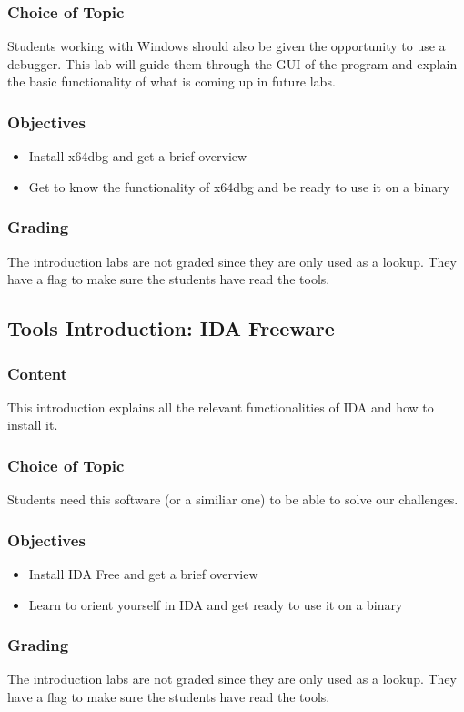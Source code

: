\subsubsection*{Choice of Topic}
Students working with Windows should also be given the opportunity to use a debugger. This lab will guide them through the GUI of the program and explain the basic functionality of what is coming up in future labs.
\subsubsection*{Objectives}
\begin{itemize}
    \item Install x64dbg and get a brief overview
    \item Get to know the functionality of x64dbg and be ready to use it on a binary
\end{itemize}
\subsubsection*{Grading}
The introduction labs are not graded since they are only used as a lookup. They have a flag to make sure the students have read the tools.


\subsection{Tools Introduction: IDA Freeware}
\subsubsection*{Content}
This introduction explains all the relevant functionalities of IDA and how to install it.
\subsubsection*{Choice of Topic}
Students need this software (or a similiar one) to be able to solve our challenges.
\subsubsection*{Objectives}
\begin{itemize}
    \item Install IDA Free and get a brief overview
    \item Learn to orient yourself in IDA and get ready to use it on a binary
\end{itemize}
\subsubsection*{Grading}
The introduction labs are not graded since they are only used as a lookup. They have a flag to make sure the students have read the tools.

